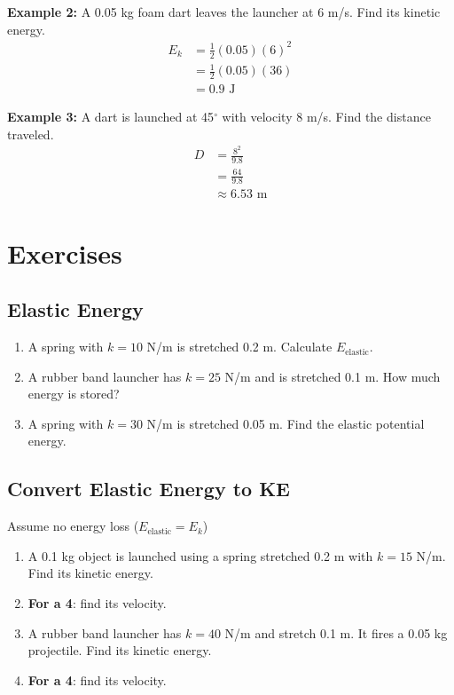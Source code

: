 \documentclass{article}
\begin{document}
\textbf{Example 2:}  
A 0.05 kg foam dart leaves the launcher at 6 m/s.  
Find its kinetic energy.
\begin{align*}
    E_k &= \frac{1}{2}(0.05)(6)^2 \\
        &= \frac{1}{2}(0.05)(36) \\
        &= 0.9 \text{ J}
\end{align*}

\textbf{Example 3:}  
A dart is launched at 45$^\circ$ with velocity 8 m/s.  
Find the distance traveled.
\begin{align*}
    D &= \frac{8^2}{9.8} \\
      &= \frac{64}{9.8} \\
      &\approx 6.53 \text{ m}
\end{align*}

\section{Exercises}

\subsection{Elastic Energy}
\begin{enumerate}
    \item A spring with $k = 10$ N/m is stretched 0.2 m. Calculate $E_{\text{elastic}}$.
    \item A rubber band launcher has $k = 25$ N/m and is stretched 0.1 m. How much energy is stored?
    \item A spring with $k = 30$ N/m is stretched 0.05 m. Find the elastic potential energy.
\end{enumerate}

\subsection{Convert Elastic Energy to KE}
Assume no energy loss ($E_{\text{elastic}} = E_k$)
\begin{enumerate}
    \item A 0.1 kg object is launched using a spring stretched 0.2 m with $k = 15$ N/m. Find its kinetic energy.
    \item \textbf{For a 4}: find its velocity. 
    \item A rubber band launcher has $k = 40$ N/m and stretch 0.1 m. It fires a 0.05 kg projectile. Find its kinetic energy.
    \item \textbf{For a 4}: find its velocity.
\end{enumerate}
\end{document}
